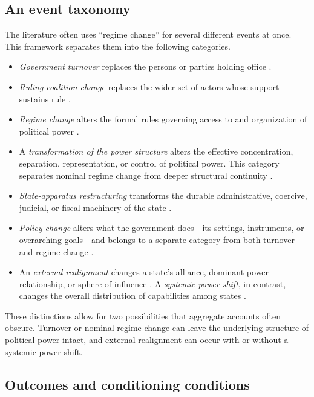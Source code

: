 \documentclass[11pt]{article}
\begin{document}
\subsection{An event taxonomy}

The literature often uses ``regime change'' for several different events at once. This framework separates them into the following categories.

\begin{itemize}
	\item \emph{Government turnover} replaces the persons or parties holding office \parencite{bueno_de_mesquita_2003}.
	\item \emph{Ruling-coalition change} replaces the wider set of actors whose support sustains rule \parencite{bueno_de_mesquita_2003}.
	\item \emph{Regime change} alters the formal rules governing access to and organization of political power \parencite{linz_stepan_1996}. 
	\item A \emph{transformation of the power structure} alters the effective concentration, separation, representation, or control of political power. This category separates nominal regime change from deeper structural continuity \parencite{garciatrevijano2010}.
	\item \emph{State-apparatus restructuring} transforms the durable administrative, coercive, judicial, or fiscal machinery of the state \parencite{skocpol_1979,althusser_1971}. 
	\item \emph{Policy change} alters what the government does---its settings, instruments, or overarching goals---and belongs to a separate category from both turnover and regime change \parencite{hall_1993}.
	\item An \emph{external realignment} changes a state's alliance, dominant-power relationship, or sphere of influence \parencite{walt_1987}. A \emph{systemic power shift}, in contrast, changes the overall distribution of capabilities among states \parencite{gilpin_1981,waltz_1979}.
\end{itemize}

These distinctions allow for two possibilities that aggregate accounts often obscure. Turnover or nominal regime change can leave the underlying structure of political power intact, and external realignment can occur with or without a systemic power shift.

\subsection{Outcomes and conditioning conditions}
\end{document}
